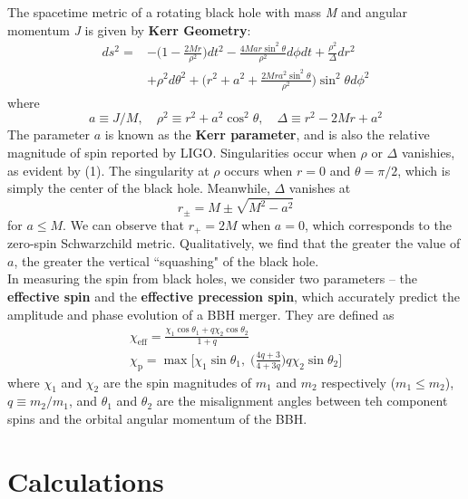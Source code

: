 \documentclass{article}
\begin{document}
The spacetime metric of a rotating black hole with mass \textit{M} and angular momentum \textit{J} is given by \textbf{Kerr Geometry}: 
\begin{equation}
    \begin{aligned}
        ds^2 = &-\Big(1 - \frac{2Mr}{\rho^2} \Big) dt^2 - \frac{4M ar \sin^2 \theta}{\rho^2} d\phi dt + \frac{\rho^2}{\Delta} dr^2\\
        & + \rho^2 d\theta^2 + \Big( r^2 + a^2 + \frac{2Mra^2 \sin^2 \theta}{\rho^2} \Big) \sin^2 \theta d \phi^2
    \end{aligned}
\end{equation}
where
\begin{equation}
    a \equiv J/M, \quad \rho^2 \equiv r^2 + a^2 \cos^2 \theta, \quad \Delta \equiv r^2 - 2Mr + a^2
\end{equation}
The parameter $a$ is known as the \textbf{Kerr parameter}, and is also the relative magnitude of spin reported by LIGO. Singularities occur when $\rho$ or $\Delta$ vanishies, as evident by (1). The singularity at $\rho$ occurs when $r = 0$ and $\theta = \pi/2$, which is simply the center of the black hole. Meanwhile, $\Delta$ vanishes at 
\begin{equation}
    r_\pm = M \pm \sqrt{M^2 - a^2}
\end{equation}
for $a \leq M$. We can observe that $r_+ = 2M$ when $a=0$, which corresponds to the zero-spin Schwarzchild metric. Qualitatively, we find that the greater the value of $a$, the greater the vertical ``squashing" of the black hole. \\

In measuring the spin from black holes, we consider two parameters -- the \textbf{effective spin} and the \textbf{effective precession spin}, which accurately predict the amplitude and phase evolution of a BBH merger. They are defined as 
\begin{gather}
    \chi_\text{eff} = \frac{\chi_1 \cos \theta_1 + q \chi_2 \cos \theta_2}{1 + q} \\
    \chi_\text{p} = \max \Big[ \chi_1 \sin \theta_1, \; \Big(\frac{4q + 3}{4 + 3q} \Big) q \chi_2 \sin \theta_2 \Big]
\end{gather}
where $\chi_1$ and $\chi_2$ are the spin magnitudes of $m_1$ and $m_2$ respectively ($m_1 \leq m_2$), $q \equiv m_2 / m_1$, and $\theta_1$ and $\theta_2$ are the misalignment angles between teh component spins and the orbital angular momentum of the BBH. 

\section{Calculations}
\end{document}
